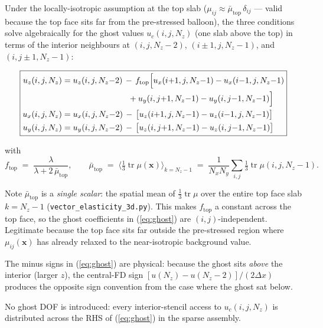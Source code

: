 \documentclass[11pt,letterpaper]{article}
\newcommand{\vect}[1]{\boldsymbol{#1}}
\begin{document}
Under the locally-isotropic assumption at the top slab
($\mu_{ij} \approx \bar\mu_{\mathrm{top}}\,\delta_{ij}$ — valid
because the top face sits far from the pre-stressed balloon), the
three conditions solve algebraically for the ghost values
$u_c(i,j,N_z)$ (one slab above the top) in terms of the interior
neighbours at $(i,j,N_z{-}2)$, $(i\pm 1,j,N_z{-}1)$, and
$(i,j\pm 1,N_z{-}1)$:

\begin{equation}
\boxed{
\begin{aligned}
u_z(i,j,N_z) &= u_z(i,j,N_z{-}2) \,-\, f_{\mathrm{top}}\Bigl[
   u_x(i{+}1,j,N_z{-}1) - u_x(i{-}1,j,N_z{-}1) \\
   & \qquad\qquad\qquad\qquad
   + u_y(i,j{+}1,N_z{-}1) - u_y(i,j{-}1,N_z{-}1)
\Bigr] \\
u_x(i,j,N_z) &= u_x(i,j,N_z{-}2) \,-\, \bigl[u_z(i{+}1,j,N_z{-}1) - u_z(i{-}1,j,N_z{-}1)\bigr] \\
u_y(i,j,N_z) &= u_y(i,j,N_z{-}2) \,-\, \bigl[u_z(i,j{+}1,N_z{-}1) - u_z(i,j{-}1,N_z{-}1)\bigr]
\end{aligned}
}
\label{eq:ghost}
\end{equation}

with
\begin{equation}
f_{\mathrm{top}} \;=\; \frac{\lambda}{\lambda + 2\,\bar\mu_{\mathrm{top}}},
\qquad
\bar\mu_{\mathrm{top}} \;=\; \biggl\langle\tfrac{1}{3}\operatorname{tr}\mu(\vect x)\biggr\rangle_{\!k = N_z-1}
\;=\;
\frac{1}{N_x N_y}\sum_{i,j}\tfrac{1}{3}\operatorname{tr}\mu(i,j,N_z{-}1).
\end{equation}

Note $\bar\mu_{\mathrm{top}}$ is a \emph{single scalar}: the spatial
mean of $\tfrac{1}{3}\operatorname{tr}\mu$ over the entire top face
slab $k = N_z{-}1$ (\texttt{vector\_elasticity\_3d.py}). This makes
$f_{\mathrm{top}}$ a constant across the top face, so the ghost
coefficients in (\ref{eq:ghost}) are $(i,j)$-independent. Legitimate
because the top face sits far outside the pre-stressed region where
$\mu_{ij}(\vect x)$ has already relaxed to the near-isotropic
background value.

The minus signs in (\ref{eq:ghost}) are physical: because the ghost
sits \emph{above} the interior (larger $z$), the central-FD sign
$[u(N_z) - u(N_z{-}2)]/(2\Delta x)$ produces the opposite sign
convention from the case where the ghost sat below.

No ghost DOF is introduced: every interior-stencil access to
$u_c(i,j,N_z)$ is distributed across the RHS of (\ref{eq:ghost}) in
the sparse assembly.
\end{document}
